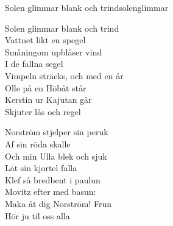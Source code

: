 \begin{song}{Solen glimmar blank och trind}{solenglimmar}
\begin{vers}
Solen glimmar blank och trind\\
Vattnet likt en spegel\\
Småningom upblåser vind\\
I de fallna segel\\
Vimpeln sträcks, och med en år\\
Olle på en Höbåt står\\
Kerstin ur Kajutan går\\
Skjuter lås och regel\\
\end{vers}
\begin{vers}
Norström stjelper sin peruk\\
Af sin röda skalle\\
Och min Ulla blek och sjuk\\
Lät sin kjortel falla\\
Klef så bredbent i paulun\\
Movitz efter med basun:\\
Maka åt dig Norström! Frun\\
Hör ju til oss alla\\
\end{vers}
\end{song}
